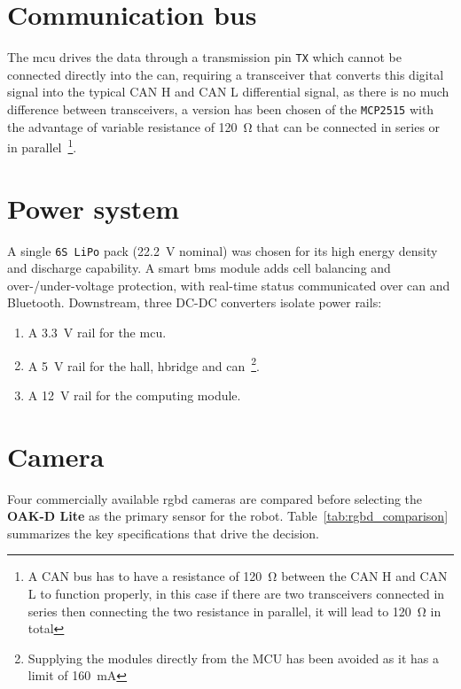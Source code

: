 \section{Communication bus}

The \gls{mcu} drives the data through a transmission pin \texttt{TX} which cannot be connected directly into the \gls{can}, requiring a transceiver that converts this digital signal into the typical CAN H and CAN L differential signal, as there is no much difference between transceivers, a version has been chosen of the \texttt{MCP2515} with the advantage of variable resistance of \SI{120}{\ohm} that can be connected in series or in parallel~\footnote{A CAN bus has to have a resistance of \SI{120}{\ohm} between the CAN H and CAN L to function properly, in this case if there are two transceivers connected in series then connecting the two resistance in parallel, it will lead to \SI{120}{\ohm} in total}.

\section{Power system}\label{sec:power}

A single \texttt{6S LiPo} pack (\SI{22.2}{\volt} nominal) was chosen for its high energy density and discharge capability. A smart \gls{bms} module adds cell balancing and over-/under-voltage protection, with real-time status communicated over \gls{can} and Bluetooth. Downstream, three DC-DC converters isolate power rails:
\begin{enumerate}
  \item A \SI{3.3}{\volt} rail for the \gls{mcu}.

  \item A \SI{5}{\volt} rail for the \gls{hall}, \gls{hbridge} and \gls{can}~\footnote{Supplying the modules directly from the MCU has been avoided as it has a limit of \SI{160}{\milli\ampere}}.

  \item A \SI{12}{\volt} rail for the computing module.
\end{enumerate}

\section{Camera}

Four commercially available \gls{rgbd} cameras are compared before selecting the \textbf{OAK-D Lite} as the primary sensor for the robot. 
Table~\ref{tab:rgbd_comparison} summarizes the key specifications that drive the decision.

